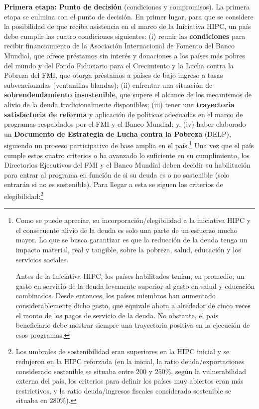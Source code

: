 \documentclass[10pt,a4paper]{article}
\begin{document}
\textbf{Primera etapa: Punto de decisión} (condiciones y compromisos). La primera etapa se culmina con el punto de decisión. En primer lugar, para que se considere la posibilidad de que reciba asistencia en el marco de la Iniciativa HIPC, un país debe cumplir las cuatro condiciones siguientes: (i) reunir las \textbf{condiciones} para recibir financiamiento de la Asociación Internacional de Fomento del Banco Mundial, que ofrece préstamos sin interés y donaciones a los países más pobres del mundo y del Fondo Fiduciario para el Crecimiento y la Lucha contra la Pobreza del FMI, que otorga préstamos a países de bajo ingreso a tasas subvencionadas (ventanillas blandas); (ii) enfrentar una situación de \textbf{sobrendeudamiento insostenible}, que supere el alcance de los mecanismos de alivio de la deuda tradicionalmente disponibles; (iii) tener una \textbf{trayectoria satisfactoria de reforma} y aplicación de políticas adecuadas en el marco de programas respaldados por el FMI y el Banco Mundial; y, (iv) haber elaborado un \textbf{Documento de Estrategia de Lucha contra la Pobreza} (DELP), siguiendo un proceso participativo de base amplia en el país.\footnote{%
    Como se puede apreciar, su incorporación/elegibilidad a la iniciativa HIPC y el consecuente alivio de la deuda es solo una parte de un esfuerzo mucho mayor. Lo que se busca garantizar es que la reducción de la deuda tenga un impacto material, real y tangible, sobre la pobreza, salud, educación y los servicios sociales. 


Antes de la Iniciativa HIPC, los países habilitados tenían, en promedio, un gasto en servicio de la deuda levemente superior al gasto en salud y educación combinados. Desde entonces, los países miembros han aumentado considerablemente dicho gasto, que equivale ahora a alrededor de cinco veces el monto de los pagos de servicio de la deuda. No obstante, el país beneficiario debe mostrar siempre una trayectoria positiva en la ejecución de esos programas.
} Una vez que el país cumple estos cuatro criterios o ha avanzado lo suficiente en su cumplimiento, los Directorios Ejecutivos del FMI y el Banco Mundial deben decidir su habilitación para entrar al programa en función de si su deuda es o no sostenible (solo entrarán si no es sostenible). Para llegar a esta se siguen los criterios de elegibilidad:\footnote{%
    Los umbrales de sostenibilidad eran superiores en la HIPC inicial y se redujeron en la HIPC reforzada (en la inicial, la ratio deuda/exportaciones considerado sostenible se situaba entre $200$ y $250\%$, según la vulnerabilidad externa del país, los criterios para definir los países muy abiertos eran más restrictivos, y la ratio deuda/ingresos fiscales considerado sostenible se situaba en $280\%$).
}
\end{document}
